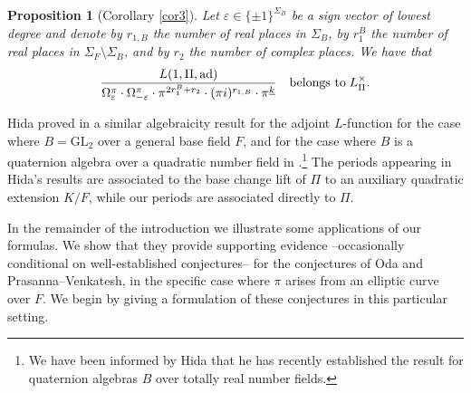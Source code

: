 \documentclass{amsart}
\newtheorem{proposition}[theorem]{Proposition}
\theoremstyle{definition}
\theoremstyle{remark}
\numberwithin{equation}{section}
\newcommand{\GL}{{\mathrm{GL}}}
\begin{document}
\begin{proposition}[Corollary \ref{cor3}]\label{prop3}
    Let $\varepsilon\in \{\pm1\}^{\Sigma_B}$ be a sign vector  of lowest degree and denote by $r_{1,B}$ the number of real places in $\Sigma_B$, by  $r_1^B$ the number of real places in $\Sigma_F\setminus\Sigma_B$, and by $r_2$ the number of complex places. We have that
    \begin{align}\label{eq:prop3}
\frac{L(1,\Pi,{\rm ad})}{\Omega^\pi_\varepsilon\cdot \Omega^\pi_{-\varepsilon}\cdot\pi^{2r_1^B+r_2}\cdot(\pi i)^{r_{1,B}}\cdot\pi^{\underline k} }\quad\text{belongs to}\; L_\Pi^\times.
\end{align}
\end{proposition}

 Hida proved in \cite{hida1} a similar algebraicity result for the adjoint $L$-function for the case where  $B=\GL_2$ over a general base field $F$, and for the case where $B$ is a quaternion algebra over a quadratic number field in \cite{hida2}.\footnote{We have been informed by Hida that he has recently established the result for quaternion algebras $B$ over totally real number fields.} The periods appearing in Hida's results are associated to the base change lift of $\Pi$ to an auxiliary quadratic extension $K/F$, while our periods are associated directly to $\Pi$. 


In the remainder of the introduction we illustrate some applications of our formulas. We  show that they provide supporting evidence --occasionally conditional on well-established conjectures-- for the conjectures of Oda and Prasanna--Venkatesh, in the specific case where $\pi$ arises from an elliptic curve over $F$. We begin by giving a formulation of these conjectures in this particular setting.
\end{document}
